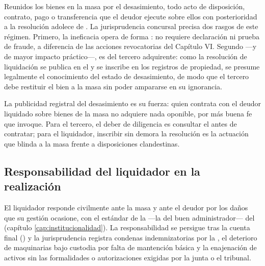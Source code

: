 Reunidos los bienes en la masa por el desasimiento, todo acto de disposición, contrato, pago o
transferencia que el deudor ejecute sobre ellos con posterioridad a la resolución adolece de
. La jurisprudencia concursal precisa dos rasgos de este
régimen. Primero, la ineficacia opera de forma : no requiere
declaración ni prueba de fraude, a diferencia de las acciones revocatorias del Capítulo VI. Segundo
---y de mayor impacto práctico---, es  del tercero adquirente:
como la resolución de liquidación se publica en el \boletin{} y se inscribe en los registros de
propiedad, se presume legalmente el conocimiento del estado de desasimiento, de modo que el tercero
debe restituir el bien a la masa sin poder ampararse en su ignorancia.

\begin{alerta}
La publicidad registral del desasimiento es su fuerza: quien contrata con el deudor liquidado sobre
bienes de la masa no adquiere nada oponible, por más buena fe que invoque. Para el tercero, el deber
de diligencia es consultar el \boletin{} antes de contratar; para el liquidador, inscribir sin
demora la resolución es la actuación que blinda a la masa frente a disposiciones clandestinas.
\end{alerta}

\subsection{Responsabilidad del liquidador en la realización}

El liquidador responde civilmente ante la masa y ante el deudor por los daños que su gestión
ocasione, con el estándar de la  ---la del buen administrador--- del 
(capítulo \ref{cap:institucionalidad}). La responsabilidad se persigue tras la cuenta final
() y la jurisprudencia registra condenas indemnizatorias por la
, el deterioro de maquinarias bajo
custodia por falta de mantención básica y la enajenación de activos sin las formalidades o
autorizaciones exigidas por la junta o el tribunal.
